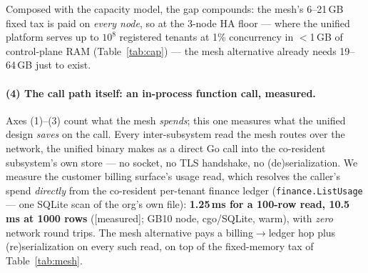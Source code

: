 \documentclass[11pt]{article}
\newcommand{\meas}{\textcolor{blue!60!black}{\small[measured]}}
\newcommand{\modeled}{\textcolor{orange!70!black}{\small[modeled]}}
\newcommand{\cited}{\textcolor{purple!70!black}{\small[cited]}}
\begin{document}
\begin{table}[h]
\centering
\caption{Fixed control-plane memory: unified binary vs.\ 56-subsystem microservice mesh, before
any tenant data. Unified base 190\,MB is \meas{}/\cited{}; bare-Go 7.2\,MB is \meas{}; per-service
framework RSS and sidecar RSS are \modeled{}/\cited{}. Multiple is mesh\,$\div$\,unified.}
\label{tab:mesh}
\end{table}

Composed with the capacity model, the gap compounds: the mesh's 6--21\,GB fixed tax is paid on
\emph{every node}, so at the 3-node HA floor --- where the unified platform serves up to
$10^8$ registered tenants at 1\% concurrency in $<$1\,GB of control-plane RAM
(Table~\ref{tab:cap}) --- the mesh alternative already needs 19--64\,GB just to exist.

\paragraph{(4) The call path itself: an in-process function call, measured.}
Axes (1)--(3) count what the mesh \emph{spends}; this one measures what the unified design
\emph{saves} on the call. Every inter-subsystem read the mesh routes over the network, the
unified binary makes as a direct Go call into the co-resident subsystem's own store --- no
socket, no TLS handshake, no (de)serialization. We measure the customer billing surface's usage
read, which resolves the caller's spend \emph{directly} from the co-resident per-tenant finance
ledger (\texttt{finance.ListUsage} --- one SQLite scan of the org's own file):
\textbf{1.25\,ms for a 100-row read, 10.5\,ms at 1000 rows} (\meas{}; GB10 node, cgo/SQLite,
warm), with \emph{zero} network round trips. The mesh alternative pays a billing$\to$ledger hop
plus (re)serialization on every such read, on top of the fixed-memory tax of
Table~\ref{tab:mesh}.
\end{document}
